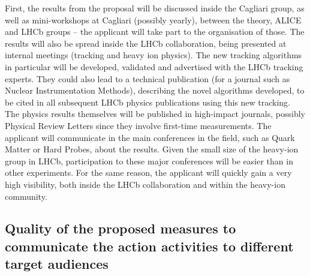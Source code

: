 \documentclass[a4paper,11pt]{article}
\begin{document}

First, the results from the proposal will be discussed inside the Cagliari group, as well as mini-workshops at Cagliari (possibly yearly), between the theory, ALICE and LHCb groups -- the applicant will take part to the organisation of those. The results will also be spread inside the LHCb collaboration, being presented at internal meetings (tracking and heavy ion physics). The new tracking algorithms in particular will be developed, validated and advertised with the LHCb tracking experts. They could also lead to a technical publication (for a journal such as Nuclear Instrumentation Methods), describing the novel algorithms developed, to be cited in all subsequent LHCb physics publications using this new tracking. The physics results themselves will be published in high-impact journals, possibly Physical Review Letters since they involve first-time measurements. The applicant will communicate in the main conferences in the field, such as Quark Matter or Hard Probes, about the results. Given the small size of the heavy-ion group in LHCb, participation to these major conferences will be easier than in other experiments. For the same reason, the applicant will quickly gain a very high visibility, both inside the LHCb collaboration and within the heavy-ion community.



%           

\subsection{Quality of the proposed measures to communicate the action activities to different target audiences }
% 
% 
\end{document}
